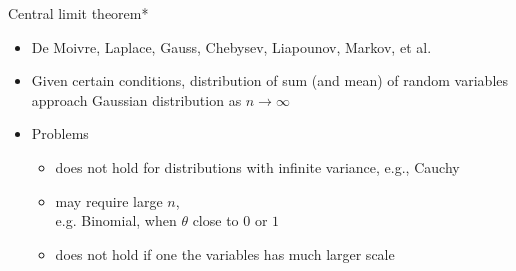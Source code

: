 \documentclass[english,t]{beamer}
\begin{document}
\begin{frame}{Central limit theorem*}

  \begin{itemize}
  \item De Moivre, Laplace, Gauss, Chebysev, Liapounov, Markov, et al.
  \item Given certain conditions, distribution of sum (and mean) of
    random variables approach Gaussian distribution as
    $n \rightarrow \infty$
  \item Problems
    \begin{itemize}
    \item does not hold for distributions with infinite variance,
      e.g., Cauchy
    \item<2-> may require large $n$,\\ e.g.
      Binomial, when $\theta$ close to $0$ or $1$
    \item<3-> does not hold if one the variables has much larger scale
    \end{itemize}
  \end{itemize}

\end{frame}


\end{document}
